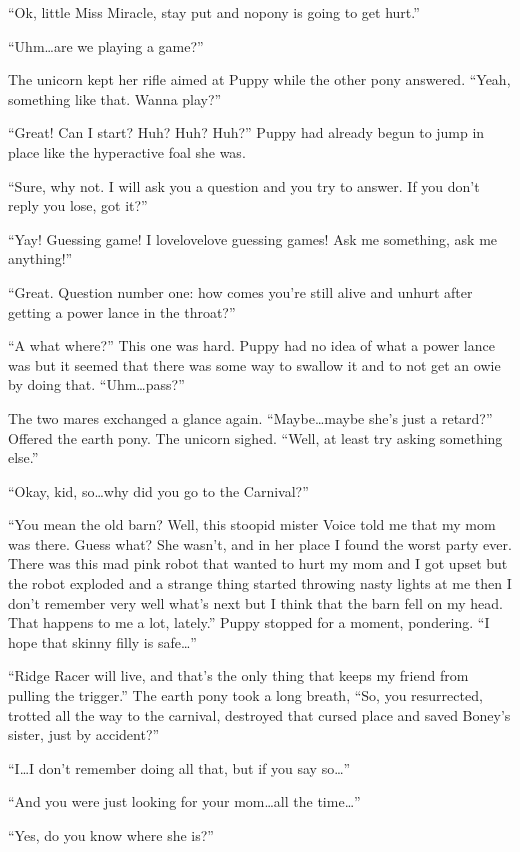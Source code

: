``Ok, little Miss Miracle, stay put and nopony is going to get hurt.''

``Uhm\dots are we playing a game?''

The unicorn kept her rifle aimed at Puppy while the other pony answered. ``Yeah, something like that. Wanna play?''

``Great! Can I start? Huh? Huh? Huh?'' Puppy had already begun to jump in place like the hyperactive foal she was.

``Sure, why not. I will ask you a question and you try to answer. If you don't reply you lose, got it?''

``Yay! Guessing game! I lovelovelove guessing games! Ask me something, ask me anything!''

``Great. Question number one: how comes you're still alive and unhurt after getting a power lance in the throat?''

``A what where?'' This one was hard. Puppy had no idea of what a power lance was but it seemed that there was some way to swallow it and to not get an owie by doing that. ``Uhm\dots pass?''

The two mares exchanged a glance again. ``Maybe\dots maybe she's just a retard?'' Offered the earth pony. The unicorn sighed. ``Well, at least try asking something else.''

``Okay, kid, so\dots why did you go to the Carnival?''

``You mean the old barn? Well, this stoopid mister Voice told me that my mom was there. Guess what? She wasn't, and in her place I found the worst party ever. There was this mad pink robot that wanted to hurt my mom and I got upset but the robot exploded and a strange thing started throwing nasty lights at me then I don't remember very well what's next but I think that the barn fell on my head. That happens to me a lot, lately.'' Puppy stopped for a moment, pondering. ``I hope that skinny filly is safe\dots''

``Ridge Racer will live, and that's the only thing that keeps my friend from pulling the trigger.'' The earth pony took a long breath, ``So, you resurrected, trotted all the way to the carnival, destroyed that cursed place and saved Boney's sister, just by accident?''

``I\dots I don't remember doing all that, but if you say so\dots''

``And you were just looking for your mom\dots all the time\dots''

``Yes, do you know where she is?''

